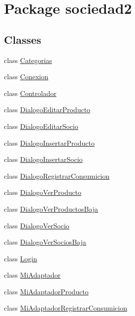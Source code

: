 \hypertarget{namespacesociedad2}{}\section{Package sociedad2}
\label{namespacesociedad2}
\subsection*{Classes}
\begin{DoxyCompactItemize}
\item 
class \mbox{\hyperlink{classsociedad2_1_1_categorias}{Categorias}}
\item 
class \mbox{\hyperlink{classsociedad2_1_1_conexion}{Conexion}}
\item 
class \mbox{\hyperlink{classsociedad2_1_1_controlador}{Controlador}}
\item 
class \mbox{\hyperlink{classsociedad2_1_1_dialogo_editar_producto}{Dialogo\+Editar\+Producto}}
\item 
class \mbox{\hyperlink{classsociedad2_1_1_dialogo_editar_socio}{Dialogo\+Editar\+Socio}}
\item 
class \mbox{\hyperlink{classsociedad2_1_1_dialogo_insertar_producto}{Dialogo\+Insertar\+Producto}}
\item 
class \mbox{\hyperlink{classsociedad2_1_1_dialogo_insertar_socio}{Dialogo\+Insertar\+Socio}}
\item 
class \mbox{\hyperlink{classsociedad2_1_1_dialogo_registrar_consumicion}{Dialogo\+Registrar\+Consumicion}}
\item 
class \mbox{\hyperlink{classsociedad2_1_1_dialogo_ver_producto}{Dialogo\+Ver\+Producto}}
\item 
class \mbox{\hyperlink{classsociedad2_1_1_dialogo_ver_productos_baja}{Dialogo\+Ver\+Productos\+Baja}}
\item 
class \mbox{\hyperlink{classsociedad2_1_1_dialogo_ver_socio}{Dialogo\+Ver\+Socio}}
\item 
class \mbox{\hyperlink{classsociedad2_1_1_dialogo_ver_socios_baja}{Dialogo\+Ver\+Socios\+Baja}}
\item 
class \mbox{\hyperlink{classsociedad2_1_1_login}{Login}}
\item 
class \mbox{\hyperlink{classsociedad2_1_1_mi_adaptador}{Mi\+Adaptador}}
\item 
class \mbox{\hyperlink{classsociedad2_1_1_mi_adaptador_producto}{Mi\+Adaptador\+Producto}}
\item 
class \mbox{\hyperlink{classsociedad2_1_1_mi_adaptador_registrar_consumicion}{Mi\+Adaptador\+Registrar\+Consumicion}}

\end{DoxyCompactItemize}
